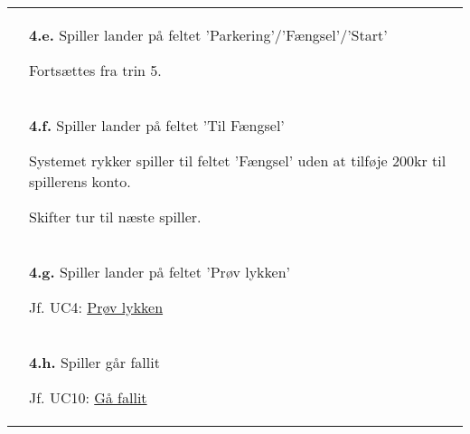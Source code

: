 \documentclass[class=article, crop=false]{standalone}
\begin{document}
\begin{table}[H]
\begin{tabularx}{\textwidth}{|l|X|}
            & \textbf{4.e.} Spiller lander på feltet 'Parkering'/'Fængsel'/'Start'
            \begin{enumerate} \begin{tabenum}
                                  \item Fortsættes fra trin 5.
            \end{tabenum} \end{enumerate}
            \\


            & \textbf{4.f.} Spiller lander på feltet 'Til Fængsel'
            \begin{enumerate} \begin{tabenum}
                                  \item Systemet rykker spiller til feltet 'Fængsel' uden at tilføje 200kr til spillerens konto.
                                  \item Skifter tur til næste spiller.
            \end{tabenum} \end{enumerate}
            \\


            & \textbf{4.g.} Spiller lander på feltet 'Prøv lykken'
            \begin{enumerate} \begin{tabenum}
                                  \item Jf. UC4: \underline{Prøv lykken}
            \end{tabenum} \end{enumerate}
            \\

            & \textbf{4.h.} Spiller går fallit
            \begin{enumerate} \begin{tabenum}
                                  \item Jf. UC10: \underline{Gå fallit}
            \end{tabenum} \end{enumerate}
            \\


            \hline

        \end{tabularx}


    \end{table}
\end{document}

